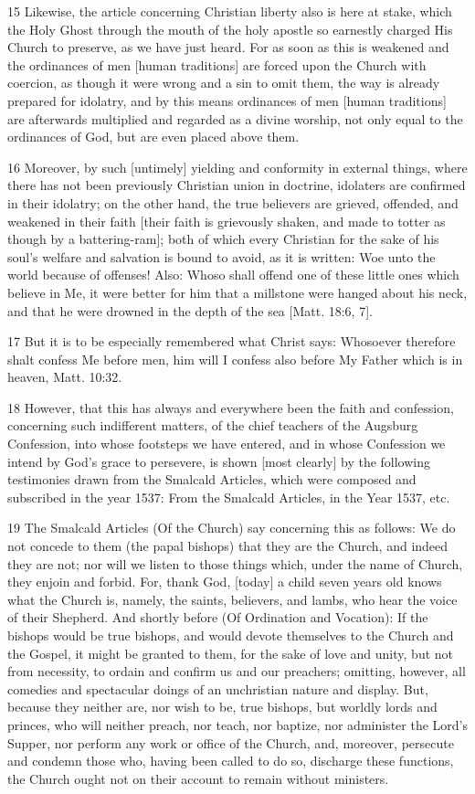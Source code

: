 {15 Likewise, the article concerning Christian liberty also is here at stake, which the Holy Ghost through the mouth of the holy apostle so earnestly charged His Church to preserve, as we have just heard. For as soon as this is weakened and the ordinances of men [human traditions] are forced upon the Church with coercion, as though it were wrong and a sin to omit them, the way is already prepared for idolatry, and by this means ordinances of men [human traditions] are afterwards multiplied and regarded as a divine worship, not only equal to the ordinances of God, but are even placed above them.

16 Moreover, by such [untimely] yielding and conformity in external things, where there has not been previously Christian union in doctrine, idolaters are confirmed in their idolatry; on the other hand, the true believers are grieved, offended, and weakened in their faith [their faith is grievously shaken, and made to totter as though by a battering-ram]; both of which every Christian for the sake of his soul’s welfare and salvation is bound to avoid, as it is written: Woe unto the world because of offenses! Also: Whoso shall offend one of these little ones which believe in Me, it were better for him that a millstone were hanged about his neck, and that he were drowned in the depth of the sea [Matt. 18:6, 7].

17 But it is to be especially remembered what Christ says: Whosoever therefore shalt confess Me before men, him will I confess also before My Father which is in heaven, Matt. 10:32.

18 However, that this has always and everywhere been the faith and confession, concerning such indifferent matters, of the chief teachers of the Augsburg Confession, into whose footsteps we have entered, and in whose Confession we intend by God’s grace to persevere, is shown [most clearly] by the following testimonies drawn from the Smalcald Articles, which were composed and subscribed in the year 1537:
From the Smalcald Articles, in the Year 1537, etc.

19 The Smalcald Articles (Of the Church) say concerning this as follows: We do not concede to them (the papal bishops) that they are the Church, and indeed they are not; nor will we listen to those things which, under the name of Church, they enjoin and forbid. For, thank God, [today] a child seven years old knows what the Church is, namely, the saints, believers, and lambs, who hear the voice of their Shepherd. And shortly before (Of Ordination and Vocation): If the bishops would be true bishops, and would devote themselves to the Church and the Gospel, it might be granted to them, for the sake of love and unity, but not from necessity, to ordain and confirm us and our preachers; omitting, however, all comedies and spectacular doings of an unchristian nature and display. But, because they neither are, nor wish to be, true bishops, but worldly lords and princes, who will neither preach, nor teach, nor baptize, nor administer the Lord’s Supper, nor perform any work or office of the Church, and, moreover, persecute and condemn those who, having been called to do so, discharge these functions, the Church ought not on their account to remain without ministers.

}
